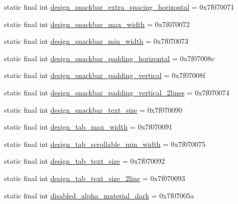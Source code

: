 \begin{CompactItemize}
\item 
static final int \hyperlink{classandroid_1_1support_1_1mediacompat_1_1_r_1_1dimen_3400d37bb129f7211ea8f68158d69081}{design\_\-snackbar\_\-extra\_\-spacing\_\-horizontal} = 0x7f070071
\item 
static final int \hyperlink{classandroid_1_1support_1_1mediacompat_1_1_r_1_1dimen_5374e86abca7028bdce97b3f5e4591c0}{design\_\-snackbar\_\-max\_\-width} = 0x7f070072
\item 
static final int \hyperlink{classandroid_1_1support_1_1mediacompat_1_1_r_1_1dimen_bb056c906415b97365a6b2df6bbe00cd}{design\_\-snackbar\_\-min\_\-width} = 0x7f070073
\item 
static final int \hyperlink{classandroid_1_1support_1_1mediacompat_1_1_r_1_1dimen_b7d9c97b6c14af0e30470402c3c8fcca}{design\_\-snackbar\_\-padding\_\-horizontal} = 0x7f07008e
\item 
static final int \hyperlink{classandroid_1_1support_1_1mediacompat_1_1_r_1_1dimen_cd4ae9393ed75515c9c0a3207c93c53b}{design\_\-snackbar\_\-padding\_\-vertical} = 0x7f07008f
\item 
static final int \hyperlink{classandroid_1_1support_1_1mediacompat_1_1_r_1_1dimen_aced187762e3b7bea21ed23852496b5c}{design\_\-snackbar\_\-padding\_\-vertical\_\-2lines} = 0x7f070074
\item 
static final int \hyperlink{classandroid_1_1support_1_1mediacompat_1_1_r_1_1dimen_3fdb8dc93485195473ae8c74f881d0b9}{design\_\-snackbar\_\-text\_\-size} = 0x7f070090
\item 
static final int \hyperlink{classandroid_1_1support_1_1mediacompat_1_1_r_1_1dimen_f4a985a908bcb19823f36d47e9dd199a}{design\_\-tab\_\-max\_\-width} = 0x7f070091
\item 
static final int \hyperlink{classandroid_1_1support_1_1mediacompat_1_1_r_1_1dimen_ce91577290cfadbd0e823924c7f51a75}{design\_\-tab\_\-scrollable\_\-min\_\-width} = 0x7f070075
\item 
static final int \hyperlink{classandroid_1_1support_1_1mediacompat_1_1_r_1_1dimen_9a019ff582f5150b72c4ecac3be74ff6}{design\_\-tab\_\-text\_\-size} = 0x7f070092
\item 
static final int \hyperlink{classandroid_1_1support_1_1mediacompat_1_1_r_1_1dimen_537ceea523763f0fa92a1bcb76c3c1d4}{design\_\-tab\_\-text\_\-size\_\-2line} = 0x7f070093
\item 
static final int \hyperlink{classandroid_1_1support_1_1mediacompat_1_1_r_1_1dimen_7a54c680b51fdc91c28eac8110044d9a}{disabled\_\-alpha\_\-material\_\-dark} = 0x7f07005a

\end{CompactItemize}
